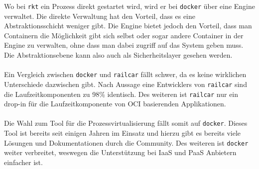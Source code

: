 \documentclass[a4paper]{article}
\begin{document}
Wo bei \texttt{rkt} ein Prozess direkt gestartet wird, wird er bei 
\texttt{docker} über eine Engine verwaltet. Die direkte Verwaltung hat den 
Vorteil, dass es eine Abstraktionsschicht weniger gibt. Die Engine bietet 
jedoch den Vorteil, dass man Containern die Möglichkeit gibt sich selbst oder 
sogar andere Container in der Engine zu verwalten, ohne dass man dabei zugriff 
auf das System geben muss. Die Abstraktionsebene kann also auch als 
Sicherheitslayer gesehen werden.\\
\\
Ein Vergleich zwischen \texttt{docker} und \texttt{railcar} fällt schwer, da es 
keine wirklichen Unterschiede dazwischen gibt. Nach Aussage eine Entwicklers 
von \texttt{railcar} sind die Laufzeitkomponenten zu 98\% 
identisch.\cite{railcarvsdocker} Des weiteren ist \texttt{railcar} nur ein 
drop-in für die Laufzeitkomponente von \ac{OCI} basierenden Applikationen.\\
\\
Die Wahl zum Tool für die Prozessvirtualisierung fällt somit auf 
\texttt{docker}. Dieses Tool ist bereits seit einigen Jahren im Einsatz und 
hierzu gibt es bereits viele Lösungen und Dokumentationen durch die Community. 
Des weiteren ist \texttt{docker} weiter verbreitet, weswegen die Unterstützung 
bei \acf{IaaS} und \acf{PaaS} Anbietern einfacher ist.
\end{document}

